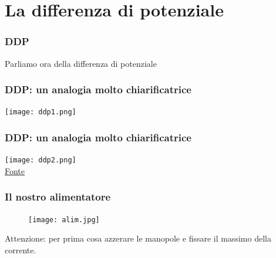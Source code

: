 	\section{La differenza di potenziale} %
	\label{sec:la_differenza_di_potenziale}
		
		\begin{frame}[c]\frametitle{DDP}
		    
			Parliamo ora della differenza di potenziale
		
		\end{frame}

		\begin{frame}[c]\frametitle{DDP: un analogia molto chiarificatrice}
		    
			\texttt{[image: ddp1.png]}
		
		\end{frame}

		\begin{frame}[c]\frametitle{DDP: un analogia molto chiarificatrice}
		    
			\texttt{[image: ddp2.png]}\\

			\href{http://web.mclink.it/MK1411/Apprendistato/ImpiantiElettrici/Lezioni\%20di\%20Elettrotecnica/Lezione\%201_30_Web.htm}{Fonte}
		
		\end{frame}

		\begin{frame}[c]\frametitle{Il nostro alimentatore}
		    
			\begin{figure}[h]
				\centering
				\texttt{[image: alim.jpg]}
				\label{fig:figure2}
			\end{figure}
			\color{red}Attenzione:
			\color{black}per prima cosa azzerare le manopole e fissare il massimo della corrente.
		
		\end{frame}


